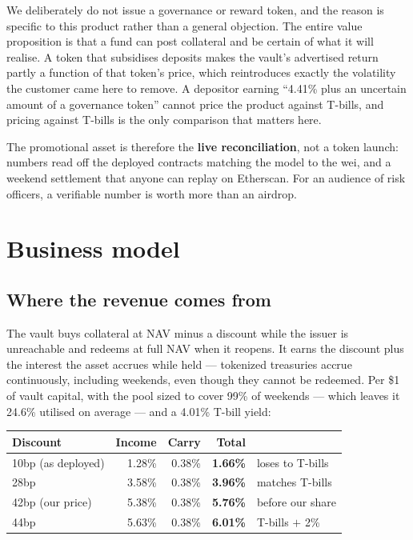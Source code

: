 \documentclass[11pt,a4paper]{article}
\begin{document}
We deliberately do not issue a governance or reward token, and the reason is specific to this
product rather than a general objection. The entire value proposition is that a fund can post
collateral and be certain of what it will realise. A token that subsidises deposits makes the
vault's advertised return partly a function of that token's price, which reintroduces exactly the
volatility the customer came here to remove. A depositor earning ``4.41\% plus an uncertain amount of
a governance token'' cannot price the product against T-bills, and pricing against T-bills is the
only comparison that matters here.

The promotional asset is therefore the \textbf{live reconciliation}, not a token launch: \reconCount{} numbers
read off the deployed contracts matching the model to the wei, and a weekend settlement that anyone
can replay on Etherscan. For an audience of risk officers, a verifiable number is worth more than an
airdrop.

\section{Business model}\label{sec:business}

\subsection{Where the revenue comes from}

The vault buys collateral at NAV minus a discount while the issuer is unreachable and redeems at full
NAV when it reopens. It earns the discount plus the interest the asset accrues while held — tokenized
treasuries accrue continuously, including weekends, even though they cannot be redeemed. Per \$1 of
vault capital, with the pool sized to cover 99\% of weekends — which leaves it 24.6\% utilised on
average — and a 4.01\% T-bill yield:

\begin{center}
\small
\begin{tabular}{@{}lrrrp{3.5cm}@{}}
\toprule
\textbf{Discount} & \textbf{Income} & \textbf{Carry} & \textbf{Total} & \\
\midrule
10bp (as deployed) & 1.28\% & 0.38\% & \textbf{1.66\%} & loses to T-bills \\
28bp & 3.58\% & 0.38\% & \textbf{3.96\%} & matches T-bills \\
42bp (our price) & 5.38\% & 0.38\% & \textbf{5.76\%} & before our share \\
44bp & 5.63\% & 0.38\% & \textbf{6.01\%} & T-bills $+$ 2\% \\
\bottomrule
\end{tabular}
\end{center}
\end{document}
